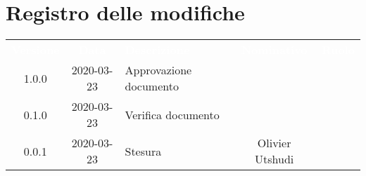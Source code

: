 \section*{Registro delle modifiche}
{
	\centering
	\begin{longtable}{ c c  C{4cm}  c  c }
		\textcolor{white}{\textbf{Versione}} & \textcolor{white}{\textbf{Data}} & \textcolor{white}{\textbf{Descrizione}} & \textcolor{white}{\textbf{Nominativo}} & \textcolor{white}{\textbf{Ruolo}}\\		
		1.0.0 & 2020-03-23 & Approvazione documento &  &\RdP{}\\		
		0.1.0 & 2020-03-23 & Verifica documento &  &\ver{}\\		
		0.0.1 & 2020-03-23 & Stesura & Olivier Utshudi &\reda{}\\		
		
	\end{longtable}

}
